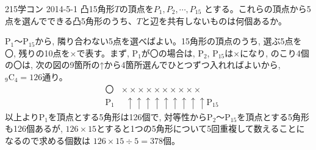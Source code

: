 \begin{prob}{215}{}{学コン 2014-5-1}
 凸15角形$T$の頂点を$P_1, P_2, \cdots, P_{15}$ とする。これらの頂点から5点を選んでできる凸5角形のうち、$T$と辺を共有しないものは何個あるか。
\end{prob}

P$_1$～P$_{15}$から, 隣り合わない5点を選べばよい。15角形の頂点のうち, 選ぶ5点を〇, 残りの10点を×で表す。まず, P$_1$が〇の場合は, P$_2$, P$_15$は×になり, のこり4個の〇は, 次の図の9箇所の↑から4箇所選んでひとつずつ入れればよいから, ${}_9 \mbox{C}_4=126$通り。
\begin{eqnarray*}
&〇&　×　×　×　×　×　×　×　×　×　×\\
&\mbox{P}_1&　\,\,\,↑　\!↑　\!\!↑　\!\!↑　\!\!↑　\!↑　\!\!↑　\!\!↑　\!↑\mbox{P}_{15}
\end{eqnarray*}
以上よりP$_1$を頂点とする5角形は126個で, 対等性からP$_2$～P$_{15}$を頂点とする5角形も126個あるが, $126\times 15$とすると1つの5角形について5回重複して数えることになるので求める個数は $126\times 15\div 5= 378$個。